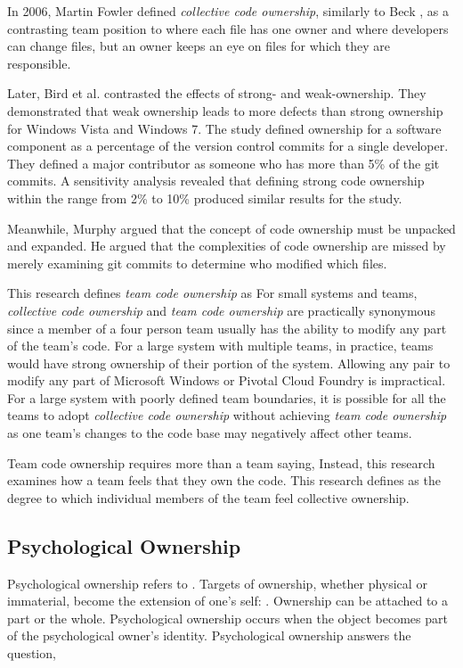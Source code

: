 In 2006, Martin Fowler defined \textit{collective code ownership}, similarly to Beck \cite{FowlerCodeOwnership}, as a contrasting team position to  where each file has one owner and  where developers can change files, but an owner keeps an eye on files for which they are responsible. 


Later, Bird et al. \cite{BirdDontTouchMyCode} contrasted the effects of strong- and weak-ownership. They demonstrated that weak ownership leads to more defects than strong ownership for Windows Vista and Windows 7. The study defined ownership for a software component as a percentage of the version control commits for a single developer. They defined a major contributor as someone who has more than 5\% of the git commits. A sensitivity analysis revealed that defining strong code ownership within the range from 2\% to 10\% produced similar results for the study.


Meanwhile, Murphy  \cite{MurphyIEEESoftware} argued that the concept of code ownership must be unpacked and expanded. He argued that the complexities of code ownership are missed by merely examining git commits to determine who modified which files.


This research defines \textit{team code ownership} as  For small systems and teams, \textit{collective code ownership} and \textit{team code ownership} are practically synonymous since a member of a four person team usually has the ability to modify any part of the team's code. For a large system with multiple teams, in practice, teams would have strong ownership of their portion of the system. Allowing any pair to modify any part of Microsoft Windows or Pivotal Cloud Foundry is impractical. For a large system with poorly defined team boundaries, it is possible for all the teams to adopt \textit{collective code ownership} without achieving \textit{team code ownership} as one team's changes to the code base may negatively affect other teams.


Team code ownership requires more than a team saying,  Instead, this research examines how a team feels that they own the code. This research defines  as the degree to which individual members of the team feel collective ownership.  


\subsection{Psychological Ownership}
Psychological ownership refers to  \cite{Pierce2001}. Targets of ownership, whether physical or immaterial, become the extension of one's self:  \cite{Isaacs1933}. Ownership can be attached to a part or the whole. Psychological ownership occurs when the object becomes part of the psychological owner's identity. Psychological ownership answers the question, 


